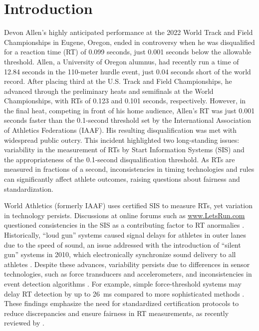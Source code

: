 \documentclass[12pt, letterpaper]{article}
\begin{document}
\doublespace


\section{Introduction}
\label{sec:intro}

Devon Allen’s highly anticipated performance at the 2022 World
Track and Field Championships in Eugene, Oregon, ended in
controversy when he was disqualified for a reaction time (RT) of
0.099 seconds, just 0.001 seconds below the allowable threshold.
Allen, a University of Oregon alumnus,
had recently run a time of 12.84 seconds in the 110-meter hurdle
event, just 0.04 seconds short of the world record. After placing
third at the U.S. Track and Field Championships, he advanced
through the preliminary heats and semifinals at the World
Championships, with RTs of 0.123 and 0.101 seconds,
respectively. However, in the final heat, competing in front of his
home audience, Allen’s RT was just 0.001 seconds faster
than the 0.1-second threshold set by the International Association
of Athletics Federations (IAAF).  His resulting disqualification was
met with widespread public outcry. This 
incident highlighted two long-standing issues: variability in the
measurement of RTs by Start Information Systems (SIS) and the
appropriateness of the 0.1-second disqualification threshold. As
RTs are measured in fractions of a second, inconsistencies
in timing technologies and rules can significantly affect athlete
outcomes, raising questions about fairness and standardization.


World Athletics (formerly IAAF) uses certified SIS to measure RTs, yet
variation in technology persists. Discussions at online forums such as
\url{www.LetsRun.com} questioned consistencies in the SIS as a
contributing factor to RT anormalies \citep{johnson2022data,
  johnson2022was}. Historically, ``loud gun'' systems caused signal delays
for athletes in outer lanes  due to the speed of sound, an issue
addressed with the introduction of ``silent gun'' systems in 2010,
which electronically synchronize sound delivery to all athletes
\citep{tonnessen2013reaction}. Despite these advances, variability
persists due to differences in sensor technologies, such as force
transducers and accelerometers, and inconsistencies in event detection
algorithms \citep{willwacher2013novel}. For example, simple
force-threshold systems may delay RT detection by up to 26~ms compared
to more sophisticated methods \citep{pain2007sprint}. These findings
emphasize the need for standardized certification protocols to reduce
discrepancies and ensure fairness in RT measurements, as recently
reviewed by \citet{milloz2021sprint}.
\end{document}
